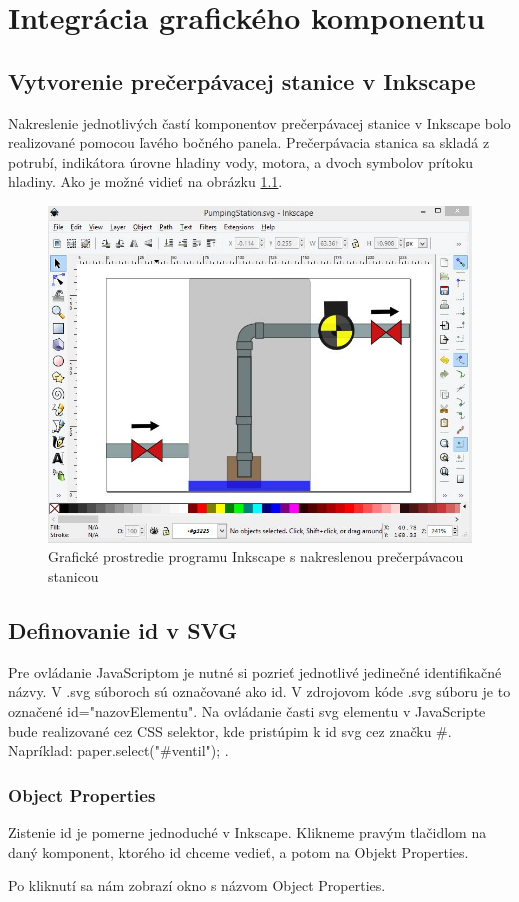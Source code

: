 \chapter{Integrácia grafického komponentu}


\section{Vytvorenie prečerpávacej stanice v Inkscape}

Nakreslenie jednotlivých častí komponentov prečerpávacej stanice v Inkscape bolo realizované pomocou ľavého bočného panela. Prečerpávacia stanica sa skladá z potrubí, indikátora úrovne hladiny vody, motora, a dvoch symbolov prítoku hladiny. Ako je možné vidieť na obrázku  \ref{picture1}.  


\begin{figure}[H]
	\begin{center}
		\includegraphics[width=0.\linewidth] {obrazky/pump1.jpg}
		\caption{Grafické prostredie programu Inkscape s nakreslenou prečerpávacou stanicou}
		\label{picture1}
	\end{center}
\end{figure}


\section{Definovanie id v SVG}

Pre ovládanie JavaScriptom je nutné si pozrieť jednotlivé jedinečné identifikačné názvy. V .svg súboroch sú označované ako id. V zdrojovom kóde .svg súboru je to označené id="nazovElementu". Na ovládanie časti svg elementu v JavaScripte bude realizované cez CSS selektor, kde pristúpim k id svg cez značku \#.  Napríklad: paper.select("\#ventil"); .


\subsection{Object Properties}
Zistenie id je pomerne jednoduché v Inkscape. Klikneme pravým tlačidlom na daný komponent, ktorého id chceme vedieť, a potom na Objekt Properties.

Po kliknutí sa nám zobrazí okno s názvom Object Properties. 

